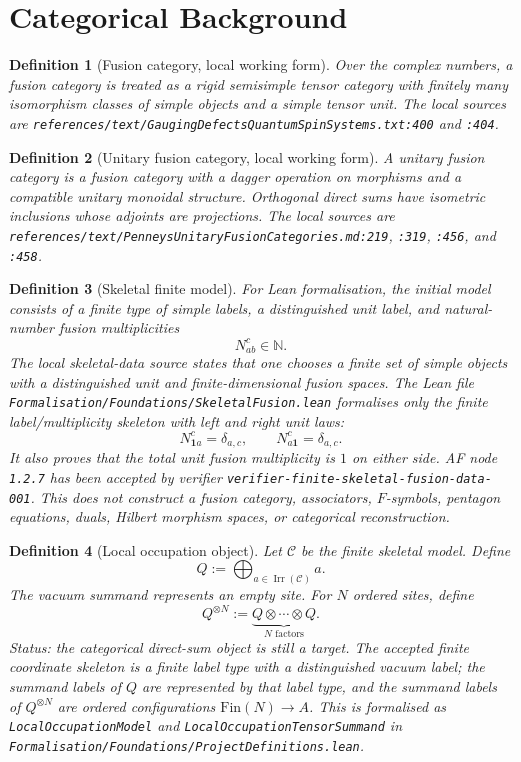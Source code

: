 \documentclass[11pt]{article}
\newtheorem{definition}{Definition}[section]
\DeclareMathOperator{\Irr}{Irr}
\begin{document}
\section{Categorical Background}

\begin{definition}[Fusion category, local working form]
Over the complex numbers, a fusion category is treated as a rigid semisimple
tensor category with finitely many isomorphism classes of simple objects and a
simple tensor unit. The local sources are
\texttt{references/text/GaugingDefectsQuantumSpinSystems.txt:400} and
\texttt{:404}.
\end{definition}

\begin{definition}[Unitary fusion category, local working form]
A unitary fusion category is a fusion category with a dagger operation on
morphisms and a compatible unitary monoidal structure. Orthogonal direct sums
have isometric inclusions whose adjoints are projections. The local sources
are \texttt{references/text/PenneysUnitaryFusionCategories.md:219},
\texttt{:319}, \texttt{:456}, and \texttt{:458}.
\end{definition}

\begin{definition}[Skeletal finite model]
For Lean formalisation, the initial model consists of a finite type of simple
labels, a distinguished unit label, and natural-number fusion multiplicities
\[
N_{ab}^{c}\in \mathbb{N}.
\]
The local skeletal-data source states that one chooses a finite set of simple
objects with a distinguished unit and finite-dimensional fusion spaces. The
Lean file \texttt{Formalisation/Foundations/SkeletalFusion.lean} formalises
only the finite label/multiplicity skeleton with left and right unit laws:
\[
N_{\mathbf 1 a}^{c}=\delta_{a,c},\qquad
N_{a\mathbf 1}^{c}=\delta_{a,c}.
\]
It also proves that the total unit fusion multiplicity is \(1\) on either
side. AF node \texttt{1.2.7} has been accepted by verifier
\texttt{verifier-finite-skeletal-fusion-data-001}. This does not construct a
fusion category, associators, \(F\)-symbols, pentagon equations, duals,
Hilbert morphism spaces, or categorical reconstruction.
\end{definition}

\begin{definition}[Local occupation object]
Let \(\mathcal C\) be the finite skeletal model. Define
\[
Q:=\bigoplus_{a\in\Irr(\mathcal C)} a.
\]
The vacuum summand represents an empty site. For \(N\) ordered sites, define
\[
Q^{\otimes N}:=\underbrace{Q\otimes \cdots \otimes Q}_{N\text{ factors}}.
\]
Status: the categorical direct-sum object is still a target. The accepted
finite coordinate skeleton is a finite label type with a distinguished vacuum
label; the summand labels of \(Q\) are represented by that label type, and the
summand labels of \(Q^{\otimes N}\) are ordered configurations
\(\mathrm{Fin}(N)\to A\). This is formalised as
\texttt{LocalOccupationModel} and \texttt{LocalOccupationTensorSummand} in
\texttt{Formalisation/Foundations/ProjectDefinitions.lean}.
\end{definition}
\end{document}
